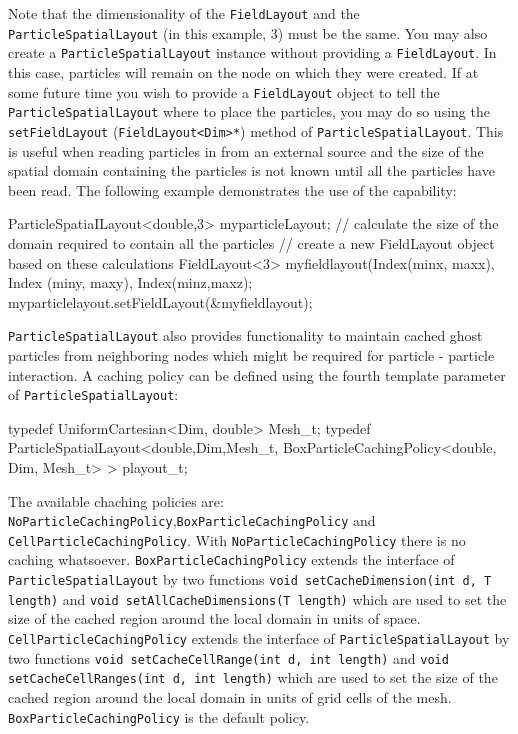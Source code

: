 Note that the dimensionality of the \texttt{FieldLayout} and the \texttt{ParticleSpatialLayout} (in this example, 3) must be the same. You may also create a \texttt{ParticleSpatialLayout} instance without providing a \texttt{FieldLayout}. In this case, particles will remain on the node on which they were created. If at some future time you wish to provide a \texttt{FieldLayout} object to tell the \texttt{ParticleSpatialLayout} where to place the particles, you may do so using the \texttt{setFieldLayout} (\texttt{FieldLayout<Dim>*}) method of \texttt{ParticleSpatialLayout}. This is useful when reading particles in from an external source and the size of the spatial domain containing the particles is not known until all the particles have been read. The following example demonstrates the use of the capability:
\begin{smallcode}
ParticleSpatiaILayout<double,3> myparticleLayout;
// calculate the size of the domain required to contain all the particles
// create a new FieldLayout object based on these calculations
FieldLayout<3> myfieldlayout(Index(minx, maxx), Index (miny, maxy),
                             Index(minz,maxz);
myparticlelayout.setFieldLayout(&myfieldlayout);
\end{smallcode}

\texttt{ParticleSpatialLayout} also provides functionality to maintain cached ghost particles from neighboring nodes which might be required for particle - particle interaction. A caching policy can be defined using the fourth template parameter of \texttt{ParticleSpatialLayout}:
\begin{smallcode}
typedef UniformCartesian<Dim, double> Mesh_t;
typedef ParticleSpatialLayout<double,Dim,Mesh_t,
        BoxParticleCachingPolicy<double, Dim, Mesh_t> > playout_t;
\end{smallcode}
The available chaching policies are: \texttt{NoParticleCachingPolicy},\texttt{BoxParticleCachingPolicy} and \texttt{CellParticleCachingPolicy}. With \texttt{NoParticleCachingPolicy} there is no caching whatsoever. \texttt{BoxParticleCachingPolicy} extends the interface of \texttt{ParticleSpatialLayout} by two functions \texttt{void setCacheDimension(int d, T length)} and \texttt{void setAllCacheDimensions(T length)} which are used to set the size of the cached region around the local domain in units of space. \texttt{CellParticleCachingPolicy} extends the interface of \texttt{ParticleSpatialLayout} by two functions \texttt{void setCacheCellRange(int d, int length)} and \texttt{void setCacheCellRanges(int d, int length)} which are used to set the size of the cached region around the local domain in units of grid cells of the mesh. \texttt{BoxParticleCachingPolicy} is the default policy.

